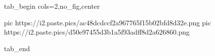  
 
 
 
 

\ifcmt
  tab_begin cols=2,no_fig,center

     pic https://i2.paste.pics/ac48dcdccf2a967765f15b02bfd8d32e.png
		 pic https://i2.paste.pics/d50e97455d3b1a5f93adff8d2a626860.png

  tab_end
\fi

